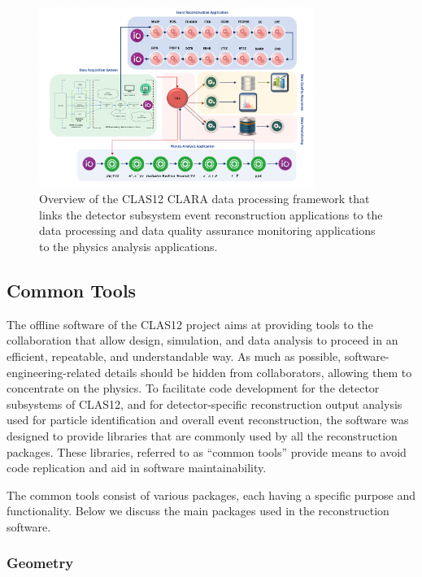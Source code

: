 \documentclass[3p,times,twocolumn]{elsarticle}
\begin{document}
\begin{figure}
\centering
\includegraphics[width=0.8\textwidth]{pics/clara-overview.pdf}
\caption{Overview of the CLAS12 CLARA data processing framework that links the detector subsystem
event reconstruction applications to the data processing and data quality assurance monitoring applications
to the physics analysis applications.}
\label{clara-overview}
\end{figure}

\subsection{Common Tools}
\label{common-tools}

﻿The offline software of the CLAS12 project aims at providing tools to
the collaboration that allow design, simulation, and data analysis to proceed
in an efficient, repeatable, and understandable way. As much as
possible, software-engineering-related details should be hidden from
collaborators, allowing them to concentrate on the physics.
To facilitate code development for the detector subsystems of CLAS12, and for detector-specific reconstruction output
analysis used for particle identification and overall event reconstruction,
the software was designed to provide libraries that are commonly used by all the reconstruction
packages.  These libraries, referred to as ``common tools'' provide means to avoid code replication and aid in software maintainability.

The common tools consist of various packages, each having a specific purpose and functionality. Below we discuss
the main packages used in the reconstruction software.

\subsubsection{Geometry}
\end{document}
